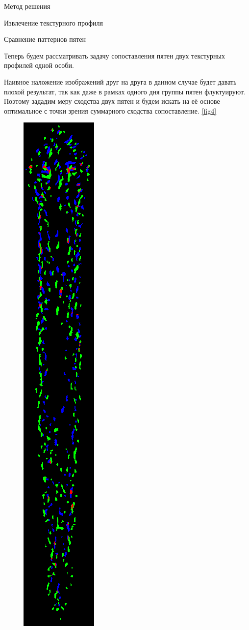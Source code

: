 \documentclass{article}
\begin{document}
\begin{section}{Метод решения}
\begin{subsection}{Извлечение текстурного профиля}
\end{subsection}

\begin{subsection}{Сравнение паттернов пятен}

Теперь будем рассматривать задачу сопоставления пятен двух текстурных профилей одной особи.

Наивное наложение изображений друг на друга в данном случае будет давать плохой результат, так как даже в рамках одного дня группы пятен флуктуируют.
Поэтому зададим меру сходства двух пятен и будем искать на её основе оптимальное с точки зрения суммарного сходства сопоставление. \ref{fig4}

\begin{figure}[H]
\centering
\includegraphics[scale=0.3]{intersection.png}

\end{figure}
\end{subsection}
\end{section}
\end{document}

